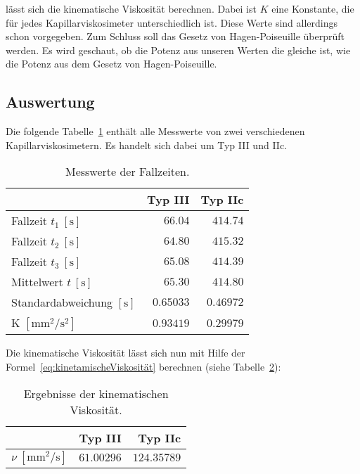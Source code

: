             lässt sich die kinematische Viskosität berechnen. Dabei ist $K$ eine Konstante, die für jedes Kapillarviskosimeter unterschiedlich ist. Diese Werte sind allerdings schon vorgegeben. Zum Schluss soll das Gesetz von Hagen-Poiseuille überprüft werden. Es wird geschaut, ob die Potenz aus unseren Werten die gleiche ist, wie die Potenz aus dem Gesetz von Hagen-Poiseuille.

        \subsection{Auswertung}

            Die folgende Tabelle~\ref{tab:MesswerteKapillarviskosimeter} enthält alle Messwerte von zwei verschiedenen Kapillarviskosimetern. Es handelt sich dabei um Typ III und IIc.

            \begin{table}[H]
                \centering
                \caption{Messwerte der Fallzeiten.}
                \vspace*{.5em}
                \begin{tabular}{|l||r|r|}
                    \hline
                    & Typ III & Typ IIc\\
                    \hline\hline
                    Fallzeit $t_{1}\ [\mathrm{s}]$ & $66.04$ & $414.74$\\
                    Fallzeit $t_{2}\ [\mathrm{s}]$ & $64.80$ & $415.32$\\
                    Fallzeit $t_{3}\ [\mathrm{s}]$ & $65.08$ & $414.39$\\
                    \hline
                    Mittelwert $t\ [\mathrm{s}]$ & $65.30$ & $414.80$\\
                    Standardabweichung $[\mathrm{s}]$ & $0.65033$ & $0.46972$\\
                    \hline
                    K $\mathrm{[mm^{2}/s^{2}]}$ & $0.93419$ & $0.29979$\\
                    \hline
                \end{tabular}
                \label{tab:MesswerteKapillarviskosimeter}
            \end{table}

            Die kinematische Viskosität lässt sich nun mit Hilfe der Formel~\ref{eq:kinetamischeViskosität} berechnen (siehe Tabelle~\ref{tab:ErgebnisseKapillarviskosimeter}):

            \begin{table}[H]
                \centering
                \caption{Ergebnisse der kinematischen Viskosität.}
                \vspace*{.5em}
                \begin{tabular}{|l||r|r|}
                    \hline
                    & Typ III & Typ IIc\\
                    \hline\hline
                    $\nu\ [\mathrm{mm^{2}/s}]$ & $61.00296$ & $124.35789$\\
                    \hline
                \end{tabular}
                \label{tab:ErgebnisseKapillarviskosimeter}
            \end{table}

